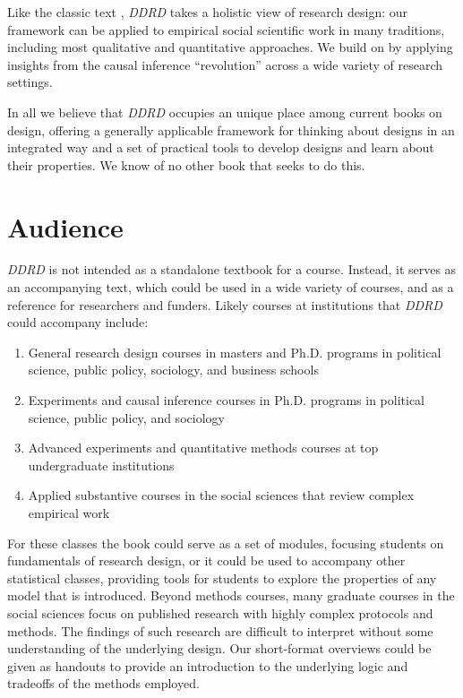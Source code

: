 \documentclass[11pt]{article}
\begin{document}
Like the classic text \citet{king1994designing}, \textit{DDRD} takes a holistic view of research design: our framework can be applied to empirical social scientific work in many traditions, including most qualitative and quantitative approaches. We build on \citet{king1994designing} by applying insights from the causal inference ``revolution'' across a wide variety of research settings.

In all we believe that \textit{DDRD} occupies an unique place among current books on design, offering a generally applicable framework for thinking about designs in an integrated way and a set of practical tools to develop designs and learn about their properties. We know of no other book that seeks to do this.

\clearpage
\section{Audience}

\textit{DDRD} is not intended as a standalone textbook for a course. Instead, it serves as an accompanying text, which could be used in a wide variety of courses, and as a reference for researchers and funders. Likely courses at institutions that \textit{DDRD} could accompany include:

\begin{enumerate}
\item General research design courses in masters and Ph.D. programs in political science, public policy, sociology, and business schools
\item Experiments and causal inference courses in Ph.D. programs in political science, public policy, and sociology
\item Advanced experiments and quantitative methods courses at top undergraduate institutions
\item Applied substantive courses in the social sciences that review complex empirical work
\end{enumerate}

For these classes the book could serve as a set of modules, focusing students on fundamentals of research design, or it could be used to accompany other statistical classes, providing tools for students to explore the properties of any model that is introduced. Beyond methods courses, many graduate courses in the social sciences focus on published research with highly complex protocols and methods. The findings of such research are difficult to interpret without some understanding of the underlying design. Our short-format overviews could be given as handouts to provide an introduction to the underlying logic and tradeoffs of the methods employed. 
\end{document}
